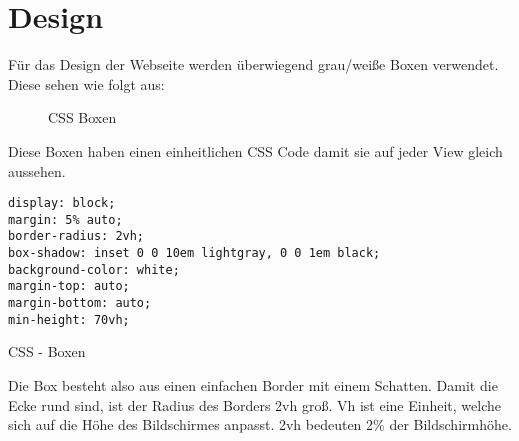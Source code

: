 \newpage
\section{Design}
\label{design}

Für das Design der Webseite werden überwiegend grau/weiße Boxen verwendet. Diese sehen wie folgt aus:

\begin{figure}[H]
    \begin{center}
      \caption{CSS Boxen}
    \end{center}
\end{figure}

Diese Boxen haben einen einheitlichen CSS Code damit sie auf jeder View gleich aussehen.

\begin{code}[htp]
\begin{lstlisting}
display: block;
margin: 5% auto;
border-radius: 2vh;
box-shadow: inset 0 0 10em lightgray, 0 0 1em black;
background-color: white;
margin-top: auto;
margin-bottom: auto;
min-height: 70vh;
\end{lstlisting}
\caption{CSS - Boxen}
\end{code}

Die Box besteht also aus einen einfachen Border mit einem Schatten. Damit die Ecke rund sind,
ist der Radius des Borders 2vh groß. Vh ist eine Einheit, welche sich auf die Höhe des Bildschirmes 
anpasst. 2vh bedeuten 2\% der Bildschirmhöhe. 
